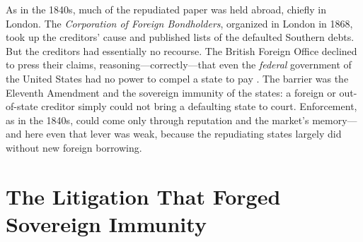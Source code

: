 \documentclass[12pt]{article}
\begin{document}
As in the 1840s, much of the repudiated paper was held abroad, chiefly in London.
The \emph{Corporation of Foreign Bondholders}, organized in London in 1868, took up
the creditors' cause and published lists of the defaulted Southern debts. But the
creditors had essentially no recourse. The British Foreign Office declined to press
their claims, reasoning---correctly---that even the \emph{federal} government of the
United States had no power to compel a state to pay \citep{mcgrane1935foreign}. The
barrier was the Eleventh Amendment and the sovereign immunity of the states: a
foreign or out-of-state creditor simply could not bring a defaulting state to court.
Enforcement, as in the 1840s, could come only through reputation and the market's
memory---and here even that lever was weak, because the repudiating states largely
did without new foreign borrowing.

\section{The Litigation That Forged Sovereign Immunity}
\label{sec:litigation}
\end{document}
